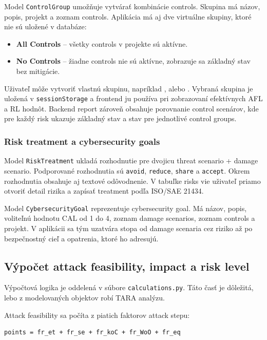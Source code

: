 \documentclass[11pt]{article}
\begin{document}
Model \texttt{ControlGroup} umožňuje vytvárať kombinácie controls. Skupina má názov, popis, projekt a zoznam controls. Aplikácia má aj dve virtuálne skupiny, ktoré nie sú uložené v databáze:

\begin{itemize}
    \item \textbf{All Controls} -- všetky controls v projekte sú aktívne.
    \item \textbf{No Controls} -- žiadne controls nie sú aktívne, zobrazuje sa základný stav bez mitigácie.
\end{itemize}

Uživateľ môže vytvoriť vlastnú skupinu, napríklad ,  alebo . Vybraná skupina je uložená v \texttt{sessionStorage} a frontend ju používa pri zobrazovaní efektívnych AFL a RL hodnôt. Backend report zároveň obsahuje porovnanie control scenárov, kde pre každý risk ukazuje základný stav a stav pre jednotlivé control groups.

\subsubsection{Risk treatment a cybersecurity goals}

Model \texttt{RiskTreatment} ukladá rozhodnutie pre dvojicu threat scenario + damage scenario. Podporované rozhodnutia sú \texttt{avoid}, \texttt{reduce}, \texttt{share} a \texttt{accept}. Okrem rozhodnutia obsahuje aj textové odôvodnenie. V tabuľke risks vie uživateľ priamo otvoriť detail rizika a zapísať treatment podľa ISO/SAE 21434.

Model \texttt{CybersecurityGoal} reprezentuje cybersecurity goal. Má názov, popis, voliteľnú hodnotu CAL od 1 do 4, zoznam damage scenarios, zoznam controls a projekt. V aplikácii sa tým uzatvára stopa od damage scenaria cez riziko až po bezpečnostný cieľ a opatrenia, ktoré ho adresujú.

\subsection{Výpočet attack feasibility, impact a risk level}

Výpočtová logika je oddelená v súbore \texttt{calculations.py}. Táto časť je dôležitá, lebo z modelovaných objektov robí TARA analýzu.

Attack feasibility sa počíta z piatich faktorov attack stepu:

\begin{verbatim}
points = fr_et + fr_se + fr_koC + fr_WoO + fr_eq
\end{verbatim}
\end{document}
